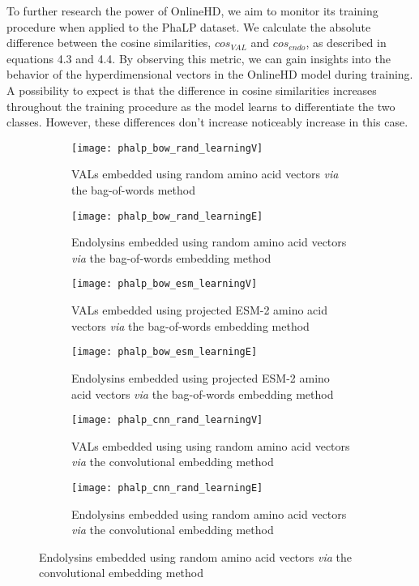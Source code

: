To further research the power of OnlineHD, we aim to monitor its training procedure when applied to the PhaLP dataset. We calculate the absolute difference between the cosine similarities, $cos_{VAL}$ and $cos_{endo}$, as described in equations 4.3 and 4.4. By observing this metric, we can gain insights into the behavior of the hyperdimensional vectors in the OnlineHD model during training. A possibility to expect is that the difference in cosine similarities increases throughout the training procedure as the model learns to differentiate the two classes. However, these differences don't increase noticeably increase in this case. 

\begin{figure}[htbp]
    \centering
    \begin{subfigure}{0.48\textwidth}
        \texttt{[image: phalp\_bow\_rand\_learningV]}
        \caption{VALs embedded using random amino acid vectors \textit{via} the bag-of-words method}
        \label{fig:subfig-a}
    \end{subfigure}
    \hfill
    \begin{subfigure}{0.48\textwidth}
        \texttt{[image: phalp\_bow\_rand\_learningE]}
        \caption{Endolysins embedded using random amino acid vectors \textit{via} the bag-of-words embedding method}
        \label{fig:subfig-b}
    \end{subfigure}
    
    \begin{subfigure}{0.48\textwidth}
        \texttt{[image: phalp\_bow\_esm\_learningV]}
        \caption{VALs embedded using projected ESM-2 amino acid vectors \textit{via} the bag-of-words embedding method}
        \label{fig:subfig-c}
    \end{subfigure}
    \hfill
    \begin{subfigure}{0.48\textwidth}
        \texttt{[image: phalp\_bow\_esm\_learningE]}
        \caption{Endolysins embedded using projected ESM-2 amino acid vectors \textit{via} the bag-of-words embedding method}
        \label{fig:subfig-d}
    \end{subfigure}
    
    \begin{subfigure}{0.48\textwidth}
        \texttt{[image: phalp\_cnn\_rand\_learningV]}
        \caption{VALs embedded using using random amino acid vectors \textit{via} the convolutional embedding method}
        \label{fig:subfig-e}
    \end{subfigure}
    \hfill
    \begin{subfigure}{0.48\textwidth}
        \texttt{[image: phalp\_cnn\_rand\_learningE]}
        \caption{Endolysins embedded using random amino acid vectors \textit{via} the convolutional embedding method}
        \label{fig:subfig-f}
    \end{subfigure}
    

\end{figure}
